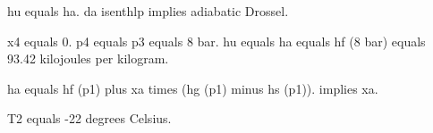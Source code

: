 hu equals ha. da isenthlp implies adiabatic Drossel.

x4 equals 0.
p4 equals p3 equals 8 bar.
hu equals ha equals hf (8 bar) equals 93.42 kilojoules per kilogram.

ha equals hf (p1) plus xa times (hg (p1) minus hs (p1)).
implies xa.

T2 equals -22 degrees Celsius.